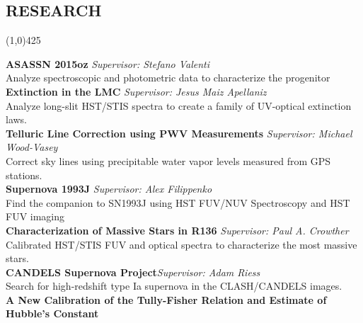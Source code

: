 \documentclass{res}
\begin{document}
\begin{resume}
\section{RESEARCH} 
\vspace{-.2in}
\begin{center}
\line(1,0){425}
\end{center}
\vspace{-.3in}
\vspace{0.1in}

{\bf ASASSN 2015oz} \hspace{179pt} \emph{Supervisor: Stefano Valenti}\\
\hspace*{24pt} Analyze spectroscopic and photometric data to characterize the progenitor\\
{\bf Extinction in the LMC}\hspace{149.95pt} \emph{Supervisor: Jesus Maiz Apellaniz}\\
\hspace*{24pt} Analyze long-slit HST/STIS spectra to create a family of UV-optical extinction laws. \\
{\bf Telluric Line Correction using PWV Measurements} \hspace{2pt} \emph{Supervisor: Michael Wood-Vasey}\\
\hspace*{24pt} Correct sky lines using precipitable water vapor levels measured from GPS stations. \\
{\bf  Supernova 1993J}\hspace{180pt} \emph{Supervisor: Alex Filippenko} \\
\hspace*{24pt} Find the companion to SN1993J using HST FUV/NUV Spectroscopy and HST FUV imaging \\
{\bf  Characterization of Massive Stars in R136 } \hspace{45pt} \emph{Supervisor: Paul A. Crowther} \\
\hspace*{24pt} Calibrated HST/STIS FUV and optical spectra to characterize the most massive stars. \\
{\bf CANDELS Supernova Project}\hspace{116pt}\emph{Supervisor: Adam Riess} \\
\hspace*{24pt} Search for high-redshift type Ia supernova in the CLASH/CANDELS images.\\
{\bf  A New Calibration of the Tully-Fisher Relation and Estimate of Hubble's Constant} \\

\end{resume}
\end{document}
